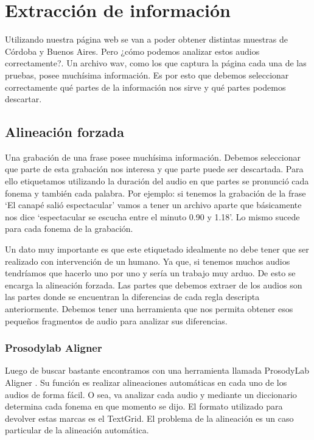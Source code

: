 \chapter{Extracción de información}

Utilizando nuestra página web se van a poder obtener distintas muestras de Córdoba y Buenos Aires. Pero ¿cómo podemos analizar estos audios correctamente?. Un archivo wav, como los que captura la página cada una de las pruebas, posee muchísima información. Es por esto que debemos seleccionar correctamente qué partes de la información nos sirve y qué partes podemos descartar. 

\section{Alineación forzada}

Una grabación de una frase posee muchísima información. Debemos seleccionar que parte de esta grabación nos interesa y que parte puede ser descartada. Para ello etiquetamos utilizando la duración del audio en que partes se pronunció cada fonema y también cada palabra. Por ejemplo: si tenemos la grabación de la frase `El canapé salió espectacular’ vamos a tener un archivo aparte que básicamente nos dice `espectacular se escucha entre el minuto 0.90 y 1.18’. Lo mismo sucede para cada fonema de la grabación.

Un dato muy importante es que este etiquetado idealmente no debe tener que ser realizado con intervención de un humano. Ya que, si tenemos muchos audios tendríamos que hacerlo uno por uno y sería un trabajo muy arduo. De esto se encarga la alineación forzada. Las partes que debemos extraer de los audios son las partes donde se encuentran la diferencias de cada regla descripta anteriormente. Debemos tener una herramienta que nos permita obtener esos pequeños fragmentos de audio para analizar sus diferencias. 

\subsection{Prosodylab Aligner}


Luego de buscar bastante encontramos con una herramienta llamada ProsodyLab Aligner \cite{prosodylab}. Su función es realizar alineaciones automáticas en cada uno de los audios de forma fácil. O sea, va analizar cada audio y mediante un diccionario determina cada fonema en que momento se dijo. El formato utilizado para devolver estas marcas es el TextGrid. El problema de la alineación es un caso particular de la alineación automática.

